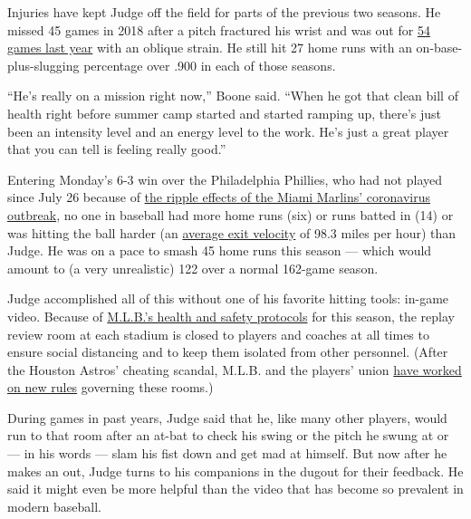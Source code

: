 Injuries have kept Judge off the field for parts of the previous two
seasons. He missed 45 games in 2018 after a pitch fractured his wrist
and was out for
\href{https://www.nytimes3xbfgragh.onion/2019/06/21/sports/aaron-judge-yankees.html}{54
games last year} with an oblique strain. He still hit 27 home runs with
an on-base-plus-slugging percentage over .900 in each of those seasons.

``He's really on a mission right now,'' Boone said. ``When he got that
clean bill of health right before summer camp started and started
ramping up, there's just been an intensity level and an energy level to
the work. He's just a great player that you can tell is feeling really
good.''

Entering Monday's 6-3 win over the Philadelphia Phillies, who had not
played since July 26 because of
\href{https://www.nytimes3xbfgragh.onion/2020/07/29/sports/baseball/yankees-schedule.html}{the
ripple effects of the Miami Marlins' coronavirus outbreak}, no one in
baseball had more home runs (six) or runs batted in (14) or was hitting
the ball harder (an
\href{https://baseballsavant.mlb.com/leaderboard/statcast?type=batter\&year=2020\&position=\&team=\&min=q\&sort=6\&sortDir=asc}{average
exit velocity} of 98.3 miles per hour) than Judge. He was on a pace to
smash 45 home runs this season --- which would amount to (a very
unrealistic) 122 over a normal 162-game season.

Judge accomplished all of this without one of his favorite hitting
tools: in-game video. Because of
\href{https://www.nytimes3xbfgragh.onion/2020/06/24/sports/baseball/mlb-coronavirus-rules.html}{M.L.B.'s
health and safety protocols} for this season, the replay review room at
each stadium is closed to players and coaches at all times to ensure
social distancing and to keep them isolated from other personnel. (After
the Houston Astros' cheating scandal, M.L.B. and the players' union
\href{https://www.nytimes3xbfgragh.onion/2020/02/24/sports/baseball/astros-cheating-scandal.html}{have
worked on new rules} governing these rooms.)

During games in past years, Judge said that he, like many other players,
would run to that room after an at-bat to check his swing or the pitch
he swung at or --- in his words --- slam his fist down and get mad at
himself. But now after he makes an out, Judge turns to his companions in
the dugout for their feedback. He said it might even be more helpful
than the video that has become so prevalent in modern baseball.

